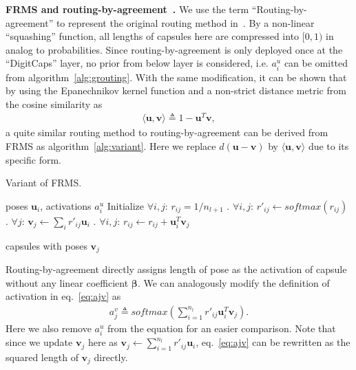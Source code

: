 \documentclass[runningheads]{llncs}
\begin{document}
\textbf{FRMS and routing-by-agreement~\cite{sabour2017dynamic}.} We use the term ``Routing-by-agreement'' to represent the original routing method in~\cite{sabour2017dynamic}. By a non-linear ``squashing'' function, all lengths of capsules here are compressed into $[0, 1)$ in analog to probabilities. Since routing-by-agreement is only deployed once at the ``DigitCaps'' layer, no prior from below layer is considered, i.e. $a_i^u$ can be omitted from algorithm~\ref{alg:grouting}. With the same modification, it can be shown that by using the Epanechnikov kernel function and a non-strict distance metric from the cosine similarity as
\begin{align}
\label{eq:innerprod}
\langle{\boldsymbol{u}, \boldsymbol{v}}\rangle\triangleq{1}-\boldsymbol{u}^T\boldsymbol{v},
\end{align}
a quite similar routing method to routing-by-agreement can be derived from FRMS as algorithm~\ref{alg:variant}. Here we replace $d(\boldsymbol{u}-\boldsymbol{v})$ by $\langle{\boldsymbol{u},\boldsymbol{v}}\rangle$ due to its specific form. 
\begin{algorithm}
  \caption{Variant of FRMS.}
  \label{alg:variant}
  \begin{algorithmic}
   \REQUIRE poses $\boldsymbol{u}_{i}$, activations $a_i^u$
   \STATE Initialize $\forall{i,j}$: $r_{ij}=1/n_{l+1}$
   . $\forall{i,j}$: $r'_{ij}\gets{softmax(r_{ij})}$
   . $\forall{j}$: $\boldsymbol{v}_j\gets{\sum_ir'_{ij}\boldsymbol{u}_i}$
   . $\forall{i,j}$: $r_{ij}\gets{r}_{ij}+\boldsymbol{u}_i^T\boldsymbol{v}_j$

   \ENDFOR
   \RETURN capsules with poses $\boldsymbol{v}_j$
  \end{algorithmic}
\end{algorithm}

Routing-by-agreement directly assigns length of pose as the activation of capsule without any linear coefficient $\boldsymbol\beta$. We can analogously modify the definition of activation in eq.~\ref{eq:ajv} as
\begin{align}
\label{eq:arba}
a_j^v\triangleq{softmax}(\sum\limits_{i=1}^{n_l}r'_{ij}\boldsymbol{u}_{i}^T\boldsymbol{v}_j).
\end{align}
Here we also remove $a_i^u$ from the equation for an easier comparison. Note that since we update $\boldsymbol{v}_j$ here as $\boldsymbol{v}_j\gets\sum_{i=1}^{n_l}r'_{ij}\boldsymbol{u}_i$, eq.~\ref{eq:ajv} can be rewritten as the squared length of $\boldsymbol{v}_j$ directly.
\end{document}
